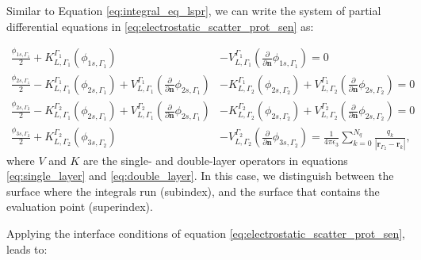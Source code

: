Similar to Equation \eqref{eq:integral_eq_lspr}, we can write the system of partial differential equations in 
\eqref{eq:electrostatic_scatter_prot_sen} as:

\begin{align} \label{eq:integral_eq_lspr_nobc_system}
\frac{\phi_{1s,\Gamma_1}}{2}+ K_{L,\Gamma_1}^{\Gamma_1}(\phi_{1s,\Gamma_1}) &- V_{L,\Gamma_1}^{\Gamma_1} \left(\frac{\partial}{\partial \mathbf{n}}\phi_{1s,\Gamma_1} \right) = 0  \nonumber \\
\frac{\phi_{2s,\Gamma_1}}{2} - K_{L,\Gamma_1}^{\Gamma_1}(\phi_{2s,\Gamma_1}) + V_{L,\Gamma_1}^{\Gamma_1} \left(\frac{\partial}{\partial \mathbf{n}}\phi_{2s,\Gamma_1} \right) 
& - K_{L,\Gamma_2}^{\Gamma_1}(\phi_{2s,\Gamma_2}) + V_{L,\Gamma_2}^{\Gamma_1} \left(\frac{\partial}{\partial \mathbf{n}}\phi_{2s,\Gamma_2} \right) = 0  \nonumber \\
\frac{\phi_{2s,\Gamma_2}}{2} - K_{L,\Gamma_1}^{\Gamma_2}(\phi_{2s,\Gamma_1}) + V_{L,\Gamma_1}^{\Gamma_2} \left(\frac{\partial}{\partial \mathbf{n}}\phi_{2s,\Gamma_1} \right)  
&- K_{L,\Gamma_2}^{\Gamma_2}(\phi_{2s,\Gamma_2}) + V_{L,\Gamma_2}^{\Gamma_2} \left(\frac{\partial}{\partial \mathbf{n}}\phi_{2s,\Gamma_2} \right) = 0  \nonumber \\
\frac{\phi_{3s,\Gamma_2}}{2} + K_{L,\Gamma_2}^{\Gamma_2}(\phi_{3s,\Gamma_2}) &- V_{L,\Gamma_2}^{\Gamma_2} \left( \frac{\partial}{\partial \mathbf{n}} \phi_{3s,\Gamma_2} \right) = \frac{1}{4\pi\epsilon_3} \sum_{k=0}^{N_q} \frac{q_k}{|\mathbf{r}_{\Gamma_2} - \mathbf{r}_k|} ,
\end{align}
%
where $V$ and $K$ are the single- and double-layer operators in equations 
\eqref{eq:single_layer} and \eqref{eq:double_layer}. In this case, we distinguish between the
surface where the integrals run (subindex), and the surface that contains the evaluation point (superindex).

Applying the interface conditions of equation \eqref{eq:electrostatic_scatter_prot_sen},
leads to: 

